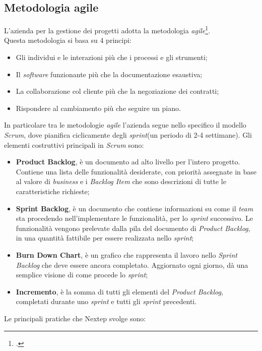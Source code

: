 \subsection{Metodologia agile}
L'azienda per la gestione dei progetti adotta la metodologia \emph{agile}\footcite{http://www.agilemanifesto.org/}.\\Questa metodologia si basa su 4 principi:
\begin{itemize}
\item Gli individui e le interazioni più che i processi e gli strumenti;
\item Il \emph{software} funzionante più che la documentazione esaustiva;
\item La collaborazione col cliente più che la negoziazione dei contratti;
\item Rispondere al cambiamento più che seguire un piano.
\end{itemize}
In particolare tra le metodologie \emph{agile} l'azienda segue nello specifico il modello \emph{Scrum}, dove pianifica ciclicamente degli \emph{sprint}(un periodo di 2-4 settimane).
\newpage
Gli elementi costruttivi principali in \emph{Scrum} sono:
\begin{itemize}
\item \textbf{Product Backlog}, è un documento ad alto livello per l'intero progetto. Contiene una lista delle funzionalità desiderate, con priorità assegnate in base al valore di \emph{business} e  i \emph{Backlog Item} che sono descrizioni di tutte le caratteristiche richieste;
\item \textbf{Sprint Backlog}, è un documento che contiene informazioni su come il \emph{team} sta procedendo nell'implementare le funzionalità, per lo \emph{sprint} successivo. Le funzionalità vengono prelevate dalla pila del documento di \emph{Product Backlog}, in una quantità fattibile per essere realizzata nello \emph{sprint};
\item \textbf{Burn Down Chart}, è un grafico che rappresenta il lavoro nello \emph{Sprint Backlog} che deve essere ancora completato. Aggiornato ogni giorno, dà una semplice visione di come procede lo \emph{sprint};
\item \textbf{Incremento}, è la somma di tutti gli elementi del \emph{Product Backlog}, completati durante uno \emph{sprint} e tutti gli \emph{sprint} precedenti.
\end{itemize}
Le principali pratiche che Nextep svolge sono:
